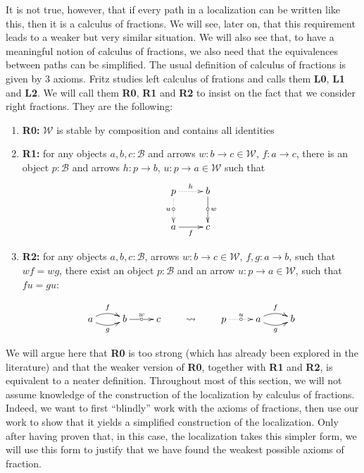 \documentclass{article}
\numberwithin{equation}{section}
\theoremstyle{definition}
\theoremstyle{plain}
\begin{document}
It is not true, however, that if every path in a localization can be written like this, then it is a calculus of fractions.  We will see, later on, that this requirement leads to a weaker but very similar situation. We will also see that, to have a meaningful notion of calculus of fractions, we also need that the equivalences between paths can be simplified. The usual definition of calculus of fractions is given by 3 axioms. Fritz \cite{fritz2011categories} studies left calculus of frations and calls them \textbf{L0}, \textbf{L1} and \textbf{L2}. We will call them \textbf{R0}, \textbf{R1} and \textbf{R2} to insist on the fact that we consider right fractions. They are the following:
\begin{enumerate}[label = $\bullet$]
	\item \textbf{R0:} $\mathcal{W}$ is stable by composition and contains all identities
	\item \textbf{R1:} for any objects $a,b,c:\mathcal{B}$ and arrows $w: b \to c \in \mathcal{W}$, $f: a \to c$, there is an object $p:\mathcal{B}$ and arrows $h: p \to b$, $u: p \to a \in \mathcal{W}$ such that \[\xymatrix{p \ar@{.>}[r]^h \ar@{.>}[d]_u|{\circ} & b\ar[d]^w|{\circ}\\a \ar[r]_f & c}\]
	
	\item \textbf{R2:} for any objects $a,b,c:\mathcal{B}$, arrows $w: b \to c \in \mathcal{W}$, $f,g: a \to b$, such that $wf = wg$, there exist an object $p:\mathcal{B}$ and an arrow $u: p \to a \in \mathcal{W}$, such that $fu = gu$:
	
	\[\xymatrix{
		a \ar@/^/[r]^f \ar@/_/[r]_g & b \ar[r]^w|{\circ} & c
	}
	\qquad \leadsto \qquad
	\xymatrix{
		p\ar@{.>}[r]^u|{\circ} & a \ar@/^/[r]^f \ar@/_/[r]_g & b
	}
	\]
\end{enumerate}

We will argue here that \textbf{R0} is too strong (which has already been explored in the literature) and that the weaker version of \textbf{R0}, together with \textbf{R1} and \textbf{R2}, is equivalent to a neater definition. Throughout most of this section, we will not assume knowledge of the construction of the localization by calculus of fractions. Indeed, we want to first ``blindly'' work with the axioms of fractions, then use our work to show that it yields a simplified construction of the localization. Only after having proven that, in this case, the localization takes this simpler form, we will use this form to justify that we have found the weakest possible axioms of fraction.
\end{document}
